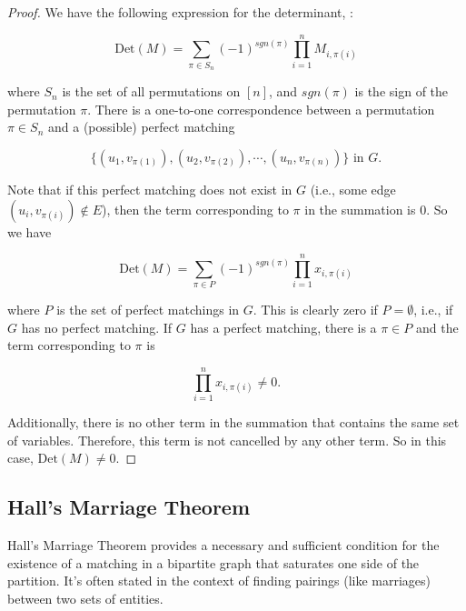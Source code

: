 \begin{proof}
    We have the following expression for the determinant, :

    $$
    \text{Det}(M) = \sum_{\pi \in S_n} (-1)^{sgn(\pi)} \prod_{i=1}^{n} M_{i,\pi(i)}
    $$

    where $S_n$ is the set of all permutations on $[n]$, and $sgn(\pi)$ is the sign of the permutation $\pi$. 
    There is a one-to-one correspondence between a permutation $\pi \in S_n$ and a (possible) perfect matching 

    $$
    \{(u_1, v_{\pi(1)}), (u_2, v_{\pi(2)}), \cdots , (u_n, v_{\pi(n)})\} \text{ in } G.
    $$

    Note that if this perfect matching does not exist in $G$ (i.e., some edge $(u_i, v_{\pi(i)}) \notin E$), then the term corresponding to $\pi$ in the summation is $0$. So we have

    $$
    \text{Det}(M) = \sum_{\pi \in P} (-1)^{sgn(\pi)} \prod_{i=1}^{n} x_{i,\pi(i)}
    $$

    where $P$ is the set of perfect matchings in $G$. This is clearly zero if $P = \emptyset$, i.e., if $G$ has no perfect matching. If $G$ has a perfect matching, there is  a $\pi \in P$ and the term corresponding to $\pi$ is

    $$
    \prod_{i=1}^{n} x_{i,\pi(i)} \neq 0.
    $$

    Additionally, there is no other term in the summation that contains the same set of variables. Therefore, this term is not cancelled by any other term. So in this case, $\text{Det}(M) \neq 0$.
\end{proof}

\subsection{ Hall's Marriage Theorem}
Hall's Marriage Theorem \cite{hall1935representatives} provides a necessary and sufficient condition for the existence of a matching in a bipartite graph that saturates one side of the partition. It's often stated in the context of finding pairings (like marriages) between two sets of entities.
    
